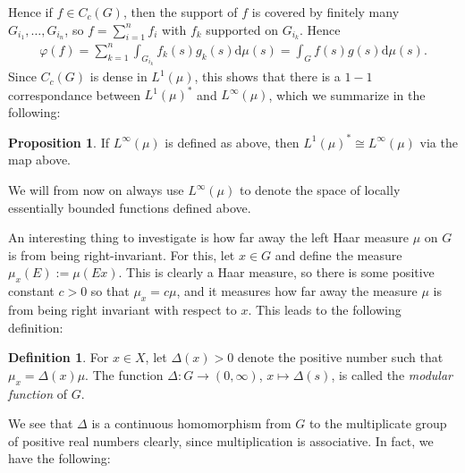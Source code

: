 \documentclass[10pt,twoside,openany,final]{memoir}
\theoremstyle{definition}
\newtheorem{proposition}[theorem]{Proposition}
\newtheorem{definition}[theorem]{Definition}
\theoremstyle{Break}
\renewcommand{\d}{\mathrm{d}}
\begin{document}
Hence if $f \in C_{c}(G)$, then the support of $f$ is covered by finitely many $G_{i_1},\dots,G_{i_n}$, so $f=\sum_{i=1}^n f_i$ with $f_k$ supported on $G_{i_k}$. Hence
\begin{align*}
	\varphi(f)=\sum_{k=1}^n \int_{G_{i_k}} f_k(s)g_k(s) \d \mu(s)=\int_{G}f(s)g(s)\d \mu(s).
\end{align*}
Since $C_c(G)$ is dense in $L^1(\mu)$, this shows that there is a $1-1$ correspondance between $L^1(\mu)^*$ and $L^\infty(\mu)$, which we summarize in the following:
\begin{proposition}
	If $L^\infty(\mu)$ is defined as above, then $L^1(\mu)^* \cong L^\infty(\mu)$ via the map above.
\end{proposition}
We will from now on always use $L^\infty(\mu)$ to denote the space of locally essentially bounded functions defined above.

An interesting thing to investigate is how far away the left Haar measure $\mu$ on $G$ is from being right-invariant. For this, let $x \in G$ and define the measure $\mu_x(E):=\mu(Ex)$. This is clearly a Haar measure, so there is some positive constant $c>0$ so that $\mu_x=c\mu$, and it measures how far away the measure $\mu$ is from being right invariant with respect to $x$. This leads to the following definition:
\begin{definition}
	For $x \in X$, let $\Delta(x)>0$ denote the positive number such that $\mu_x=\Delta(x) \mu$. The function $\Delta \colon G \to (0,\infty)$, $x \mapsto \Delta(s)$, is called the \emph{modular function} of $G$.
\end{definition}
We see that $\Delta$ is a continuous homomorphism from $G$ to the multiplicate group of positive real numbers clearly, since multiplication is associative. In fact, we have the following:
\end{document}
